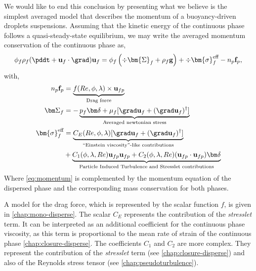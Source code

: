 We would like to end this conclusion by presenting what we believe is the simplest averaged model that describes the momentum of a buoyancy-driven droplets suspensions. 
Assuming that the kinetic energy of the continuous phase follows a quasi-steady-state equilibrium, we may write the averaged momentum conservation of the continuous phase as, 
\begin{align}
    \phi_f\rho_f (\pddt + \textbf{u}_f\cdot \grad)\textbf{u}_f
    = \phi_f 
    \left(\div \bm{\Sigma}_f
    + \rho_f \textbf{g}\right)
    + \div  \bm{\sigma}_f^{\text{eff}}
    - n_p \textbf{f}_p,
    \label{eq:momentum}
\end{align}
with, 
\begin{align}
    n_p \textbf{f}_p  
    &= 
    \underbrace{f(Re,\phi, \lambda) \times \textbf{u}_{fp}}_\text{Drag force}
    \label{eq:draggggg}
    \\
    \label{eq:newtonian}
  \bm\Sigma_f &= - \underbrace{p_f \bm\delta + \mu_f [\grad \textbf{u}_f +  (\grad \textbf{u}_f)^\dagger ]}_\text{Averaged newtonian stress} 
  \\
    \bm{\sigma}^{\text{eff}}_f 
    &= \underbrace{ C_E(Re,\phi,\lambda)  [\grad \textbf{u}_f +  (\grad \textbf{u}_f)^\dagger ] }_\text{``Einstein viscosity''-like contributions}
    \nonumber\\
    &+ 
    \underbrace{
      C_1(\phi,\lambda,Re)\textbf{u}_{fp}\textbf{u}_{fp}
      +  C_2(\phi,\lambda,Re)(\textbf{u}_{fp}\cdot \textbf{u}_{fp})     \bm\delta}_\text{Particle Induced Turbulence and Stresslet contributions}
    \label{eq:stress}
\end{align}
Where \ref{eq:momentum} is complemented by the momentum equation of the dispersed phase and the corresponding mass conservation for both phases. 

A model for the drag force, which is represented by the scalar function $f$, is given in \ref{chap:mono-disperse}. 
The scalar $C_E$ represents the contribution of the \textit{stresslet} term.
It can be interpreted as an additional coefficient for the continuous phase viscosity, as this term is proportional to the mean rate of strain of the continuous phase \eqref{chap:closure-disperse}.
The coefficients $C_1$ and $C_2$ are more complex. 
They represent the contribution of the \textit{stresslet} term (see \ref{chap:closure-disperse}) and also of the Reynolds stress tensor (see \ref{chap:pseudoturbulence}). 



